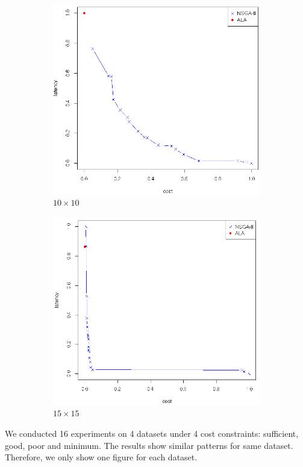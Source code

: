 \documentclass{llncs}
\begin{document}
\begin{figure}[H]
	\begin{subfigure}[b]{0.4\textwidth}
		\includegraphics[width=\textwidth]{pics/111.png}
		\caption{$10 \times 10$}
		\label{fig:10_10}
	\end{subfigure}
	\begin{subfigure}[b]{0.4\textwidth}
		\includegraphics[width=\textwidth]{pics/112.png}
		\caption{$15 \times 15$}
		\label{fig:15_15}
	\end{subfigure}

	\caption{}\label{fig:condition}
\end{figure}
We conducted 16 experiments on 4 datasets under 4 cost constraints: sufficient, good, poor and minimum. The results show similar 
patterns for same dataset. Therefore, we only show one figure for each dataset.
\end{document}
